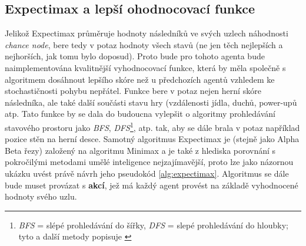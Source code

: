 \subsection*{Expectimax a lepší ohodnocovací funkce}
\label{navrh:expectimax}
Jelikož Expectimax průměruje hodnoty následníků ve svých uzlech náhodnosti \textit{chance node}, bere tedy v potaz hodnoty všech stavů (ne jen těch nejlepších a nejhorších, jak tomu bylo doposud). Proto bude pro tohoto agenta bude naimplementována kvalitnější vyhodnocovací funkce, která by měla společně s algoritmem dosáhnout lepšího skóre než u předchozích agentů vzhledem ke stochastičnosti pohybu nepřátel. Funkce bere v potaz nejen herní skóre následníka, ale také další součásti stavu hry (vzdálenosti jídla, duchů, power-upů atp. Tato funkce by se dala do budoucna vylepšit o algoritmy prohledávání stavového prostoru jako \textit{BFS}, \textit{DFS}\footnote{\textit{BFS} = slépé prohledávání do šířky, \textit{DFS} = slepé prohledávání do hloubky; tyto a další metody popisuje \cite{AI1}}, atp. tak, aby se dále brala v potaz například pozice stěn na herní desce. 
\newline
Samotný algoritmus Expectimax je (stejně jako Alpha Beta řezy) založený na algoritmu Minimax a je také z hlediska porovnání s pokročilými metodami umělé inteligence nejzajímavější, proto lze jako názornou ukázku uvést právě návrh jeho pseudokód \ref{alg:expectimax}. Algoritmus se dále bude muset provázat s \textbf{akcí}, jež má každý agent provést na základě vyhodnocené hodnoty svého uzlu.


